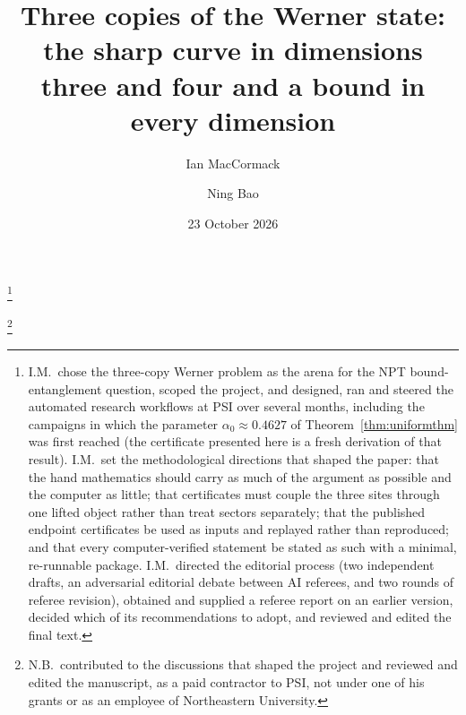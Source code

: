 \documentclass[aps,pra,twocolumn,superscriptaddress,nofootinbib,longbibliography]{revtex4-2}
\theoremstyle{plain}
\theoremstyle{definition}
\theoremstyle{remark}
\begin{document}
\title{Three copies of the Werner state:\texorpdfstring{\\}{ }the sharp curve in dimensions three and four and a bound in every dimension}
\author{Ian MacCormack}\thanks{I.M.\ chose the three-copy Werner problem as the arena for the NPT bound-entanglement question, scoped the project, and designed, ran and steered the automated research workflows at PSI over several months, including the campaigns in which the parameter $\alpha_0\approx0.4627$ of Theorem~\ref{thm:uniformthm} was first reached (the certificate presented here is a fresh derivation of that result). I.M.\ set the methodological directions that shaped the paper: that the hand mathematics should carry as much of the argument as possible and the computer as little; that certificates must couple the three sites through one lifted object rather than treat sectors separately; that the published endpoint certificates be used as inputs and replayed rather than reproduced; and that every computer-verified statement be stated as such with a minimal, re-runnable package. I.M.\ directed the editorial process (two independent drafts, an adversarial editorial debate between AI referees, and two rounds of referee revision), obtained and supplied a referee report on an earlier version, decided which of its recommendations to adopt, and reviewed and edited the final text.}
\author{Ning Bao}\thanks{N.B.\ contributed to the discussions that shaped the project and reviewed and edited the manuscript, as a paid contractor to PSI, not under one of his grants or as an employee of Northeastern University.}
\date{23 October 2026}
\end{document}
